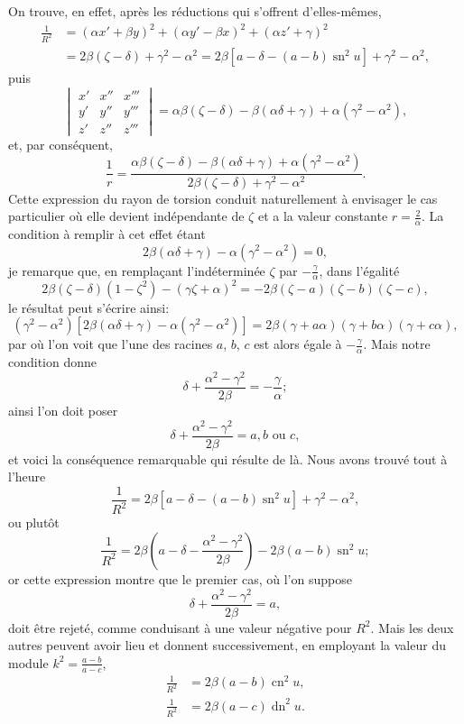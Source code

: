 \documentclass[11pt,leqno,oneside,letterpaper]{book}[2005/09/16]
\DeclareMathOperator{\sn}{sn}
\DeclareMathOperator{\cn}{cn}
\DeclareMathOperator{\dn}{dn}
\begin{document}
On trouve, en effet, apr\`es les r\'eductions qui s'offrent d'elles-m\^emes,
\begin{align*}
  \frac{1}{R^2} &= (\alpha x' + \beta y)^2 +
                   (\alpha y' - \beta x)^2 +
                   (\alpha z' + \gamma)^2       \\
  &= 2\beta(\zeta - \delta) + \gamma^2 - \alpha^2 =
     2\beta \left[a - \delta - (a - b) \sn^2 u \right] + \gamma^2 - \alpha^2,
\end{align*}
puis
\[
  \begin{vmatrix}
    x' & x'' & x''' \\
    y' & y'' & y''' \\
    z' & z'' & z'''
  \end{vmatrix}
  = \alpha\beta(\zeta-\delta)-\beta(\alpha\delta+\gamma)+\alpha(\gamma^2-\alpha^2),
\]
et, par cons\'equent,
\[
  \frac{1}{r} = \frac{\alpha\beta(\zeta-\delta)-\beta(\alpha\delta+\gamma)+\alpha(\gamma^2-\alpha^2)}
                {2\beta(\zeta-\delta)+\gamma^2-\alpha^2}.
\]
Cette expression du rayon de torsion conduit naturellement \`a envisager
le cas particulier o\`u elle devient ind\'ependante de $\zeta$ et a la valeur constante
$r=\frac{2}{\alpha}$. La condition \`a remplir \`a cet effet \'etant
\[
  2\beta(\alpha\delta+\gamma)-\alpha(\gamma^2-\alpha^2)=0,
\]
je remarque que, en rempla\c{c}ant l'ind\'etermin\'ee $\zeta$ par $-\frac{\gamma}{\alpha}$, dans l'\'egalit\'e
\[
  2\beta(\zeta-\delta)(1-\zeta^2)-(\gamma\zeta+\alpha)^2 =
    -2\beta(\zeta-a)(\zeta-b)(\zeta-c),
\]
le r\'esultat peut s'\'ecrire ainsi:
\[
  (\gamma^2-\alpha^2)\left[2\beta(\alpha\delta+\gamma)-\alpha(\gamma^2-\alpha^2)\right] =
    2\beta(\gamma+a\alpha)(\gamma+b\alpha)(\gamma+c\alpha),
\]
par o\`u l'on voit que l'une des racines $a$, $b$, $c$ est alors \'egale \`a
$-\frac{\gamma}{\alpha}$. Mais notre condition donne
\[
  \delta + \frac{\alpha^2-\gamma^2}{2\beta} = -\frac{\gamma}{\alpha};
\]
ainsi l'on doit poser
\[
\delta + \frac{\alpha^2-\gamma^2}{2\beta} = a, b \text{ ou } c,
\]
et voici la cons\'equence remarquable qui r\'esulte de l\`a. Nous avons trouv\'e
tout \`a l'heure
\[
\frac{1}{R^2}=2\beta\left[a-\delta-(a-b)\sn^2 u\right]+\gamma^2-\alpha^2,
\]
ou plut\^ot
\[
\frac{1}{R^2}=2\beta\left(a-\delta-\frac{\alpha^2-\gamma^2}{2\beta}\right)
  - 2\beta(a-b)\sn^2 u;
\]
or cette expression montre que le premier cas, o\`u l'on suppose
\[
\delta + \frac{\alpha^2-\gamma^2}{2\beta} = a,
\]
doit \^etre rejet\'e, comme conduisant \`a une valeur n\'egative pour $R^2$. Mais les
deux autres peuvent avoir lieu et donnent successivement, en employant
la valeur du module $k^2=\frac{a-b}{a-c}$,
\begin{align*}
  \frac{1}{R^2} &= 2\beta(a-b)\cn^2u, \\
  \frac{1}{R^2} &= 2\beta(a-c)\dn^2u.
\end{align*}
\end{document}
